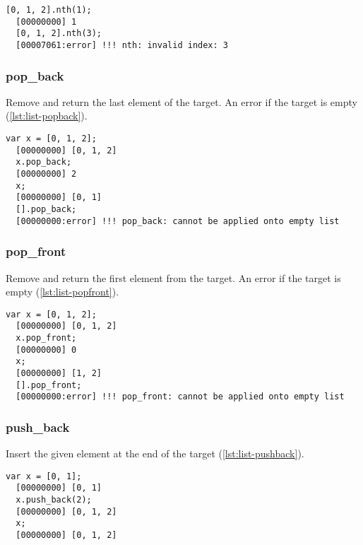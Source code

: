 \begin{lstlisting}[caption=List.nth, label=lst:list-nth, float=\floatposh]
  [0, 1, 2].nth(1);
  [00000000] 1
  [0, 1, 2].nth(3);
  [00007061:error] !!! nth: invalid index: 3
\end{lstlisting}

\subsubsection{pop\_back}

Remove and return the last element of the target. An error if the
target is empty (\autoref{lst:list-popback}).

\begin{lstlisting}[caption=List.pop\_back, label=lst:list-popback, float=\floatposh]
  var x = [0, 1, 2];
  [00000000] [0, 1, 2]
  x.pop_back;
  [00000000] 2
  x;
  [00000000] [0, 1]
  [].pop_back;
  [00000000:error] !!! pop_back: cannot be applied onto empty list
\end{lstlisting}

\subsubsection{pop\_front}

Remove and return the first element from the target. An error if the
target is empty (\autoref{lst:list-popfront}).

\begin{lstlisting}[caption=List.pop\_front, label=lst:list-popfront, float=\floatposh]
  var x = [0, 1, 2];
  [00000000] [0, 1, 2]
  x.pop_front;
  [00000000] 0
  x;
  [00000000] [1, 2]
  [].pop_front;
  [00000000:error] !!! pop_front: cannot be applied onto empty list
\end{lstlisting}

\subsubsection{push\_back}
\label{sec:std-list-pushback}

Insert the given element at the end of the target
(\autoref{lst:list-pushback}).

\begin{lstlisting}[caption=List.push\_back, label=lst:list-pushback, float=\floatposh]
  var x = [0, 1];
  [00000000] [0, 1]
  x.push_back(2);
  [00000000] [0, 1, 2]
  x;
  [00000000] [0, 1, 2]
\end{lstlisting}

